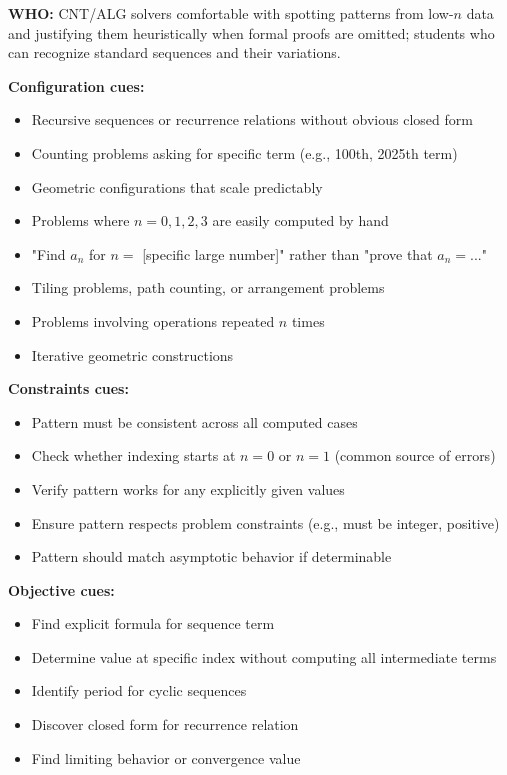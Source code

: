 \documentclass[12pt]{article}
\begin{document}
\textbf{WHO:} CNT/ALG solvers comfortable with spotting patterns from low-$n$ data and justifying them heuristically when formal proofs are omitted; students who can recognize standard sequences and their variations.

\textbf{Configuration cues:}
\begin{itemize}
    \item Recursive sequences or recurrence relations without obvious closed form
    \item Counting problems asking for specific term (e.g., 100th, 2025th term)
    \item Geometric configurations that scale predictably
    \item Problems where $n=0,1,2,3$ are easily computed by hand
    \item "Find $a_n$ for $n=$ [specific large number]" rather than "prove that $a_n=$..."
    \item Tiling problems, path counting, or arrangement problems
    \item Problems involving operations repeated $n$ times
    \item Iterative geometric constructions
\end{itemize}

\textbf{Constraints cues:}
\begin{itemize}
    \item Pattern must be consistent across all computed cases
    \item Check whether indexing starts at $n=0$ or $n=1$ (common source of errors)
    \item Verify pattern works for any explicitly given values
    \item Ensure pattern respects problem constraints (e.g., must be integer, positive)
    \item Pattern should match asymptotic behavior if determinable
\end{itemize}

\textbf{Objective cues:}
\begin{itemize}
    \item Find explicit formula for sequence term
    \item Determine value at specific index without computing all intermediate terms
    \item Identify period for cyclic sequences
    \item Discover closed form for recurrence relation
    \item Find limiting behavior or convergence value
\end{itemize}
\end{document}
